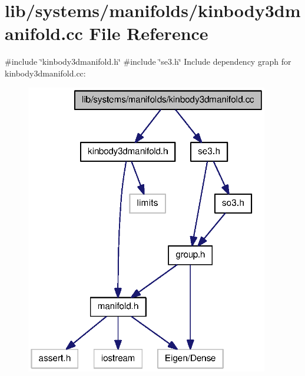 \section{lib/systems/manifolds/kinbody3dmanifold.cc \-File \-Reference}
\label{kinbody3dmanifold_8cc}
{\ttfamily \#include \char`\"{}kinbody3dmanifold.\-h\char`\"{}}\*
{\ttfamily \#include \char`\"{}se3.\-h\char`\"{}}\*
\-Include dependency graph for kinbody3dmanifold.\-cc\-:
\nopagebreak
\begin{figure}[H]
\begin{center}
\leavevmode
\includegraphics[width=301pt]{kinbody3dmanifold_8cc__incl}
\end{center}
\end{figure}
